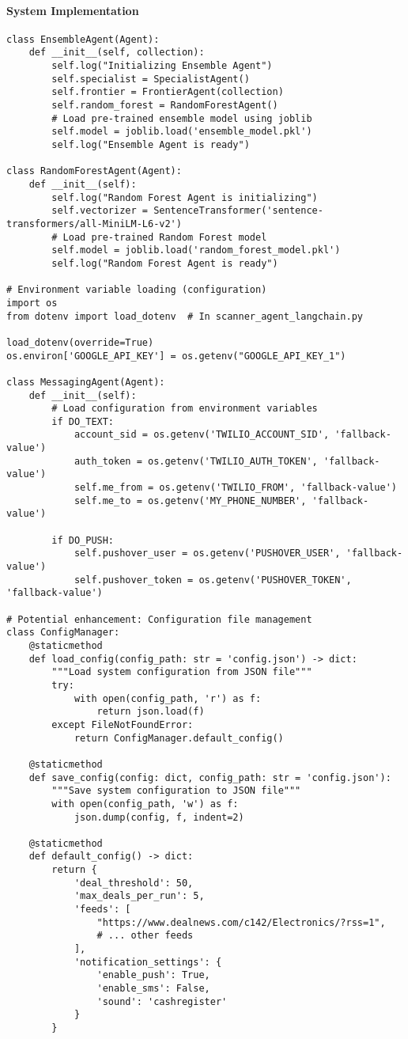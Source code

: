 \paragraph{System Implementation}
\begin{lstlisting}[caption=Serialization in Agent System]
class EnsembleAgent(Agent):
    def __init__(self, collection):
        self.log("Initializing Ensemble Agent")
        self.specialist = SpecialistAgent()
        self.frontier = FrontierAgent(collection)
        self.random_forest = RandomForestAgent()
        # Load pre-trained ensemble model using joblib
        self.model = joblib.load('ensemble_model.pkl')
        self.log("Ensemble Agent is ready")

class RandomForestAgent(Agent):
    def __init__(self):
        self.log("Random Forest Agent is initializing")
        self.vectorizer = SentenceTransformer('sentence-transformers/all-MiniLM-L6-v2')
        # Load pre-trained Random Forest model
        self.model = joblib.load('random_forest_model.pkl')
        self.log("Random Forest Agent is ready")

# Environment variable loading (configuration)
import os
from dotenv import load_dotenv  # In scanner_agent_langchain.py

load_dotenv(override=True)
os.environ['GOOGLE_API_KEY'] = os.getenv("GOOGLE_API_KEY_1")

class MessagingAgent(Agent):
    def __init__(self):
        # Load configuration from environment variables
        if DO_TEXT:
            account_sid = os.getenv('TWILIO_ACCOUNT_SID', 'fallback-value')
            auth_token = os.getenv('TWILIO_AUTH_TOKEN', 'fallback-value')
            self.me_from = os.getenv('TWILIO_FROM', 'fallback-value')
            self.me_to = os.getenv('MY_PHONE_NUMBER', 'fallback-value')
        
        if DO_PUSH:
            self.pushover_user = os.getenv('PUSHOVER_USER', 'fallback-value')
            self.pushover_token = os.getenv('PUSHOVER_TOKEN', 'fallback-value')

# Potential enhancement: Configuration file management
class ConfigManager:
    @staticmethod
    def load_config(config_path: str = 'config.json') -> dict:
        """Load system configuration from JSON file"""
        try:
            with open(config_path, 'r') as f:
                return json.load(f)
        except FileNotFoundError:
            return ConfigManager.default_config()
    
    @staticmethod
    def save_config(config: dict, config_path: str = 'config.json'):
        """Save system configuration to JSON file"""
        with open(config_path, 'w') as f:
            json.dump(config, f, indent=2)
    
    @staticmethod
    def default_config() -> dict:
        return {
            'deal_threshold': 50,
            'max_deals_per_run': 5,
            'feeds': [
                "https://www.dealnews.com/c142/Electronics/?rss=1",
                # ... other feeds
            ],
            'notification_settings': {
                'enable_push': True,
                'enable_sms': False,
                'sound': 'cashregister'
            }
        }
\end{lstlisting}

